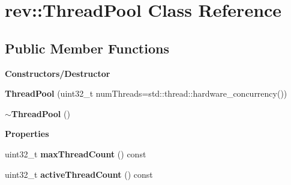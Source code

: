 \hypertarget{classrev_1_1_thread_pool}{}\section{rev\+::Thread\+Pool Class Reference}
\label{classrev_1_1_thread_pool}
\subsection*{Public Member Functions}
\begin{Indent}\textbf{ Constructors/\+Destructor}\par
\begin{DoxyCompactItemize}
\item 
\mbox{\label{classrev_1_1_thread_pool_aa8a4c29931931b16cbc300d8fcc3d8dc}} 
{\bfseries Thread\+Pool} (uint32\+\_\+t num\+Threads=std\+::thread\+::hardware\+\_\+concurrency())
\item 
\mbox{\label{classrev_1_1_thread_pool_aed57174265018369b9a0fdafc848c9d0}} 
{\bfseries $\sim$\+Thread\+Pool} ()
\end{DoxyCompactItemize}
\end{Indent}
\begin{Indent}\textbf{ Properties}\par
\begin{DoxyCompactItemize}
\item 
\mbox{\label{classrev_1_1_thread_pool_a8fbb372c4f8b800cfa6d3c4808032a89}} 
uint32\+\_\+t {\bfseries max\+Thread\+Count} () const
\item 
\mbox{\label{classrev_1_1_thread_pool_a0ee0ed1b559460333d762ee1ccd3cdea}} 
uint32\+\_\+t {\bfseries active\+Thread\+Count} () const
\end{DoxyCompactItemize}
\end{Indent}
